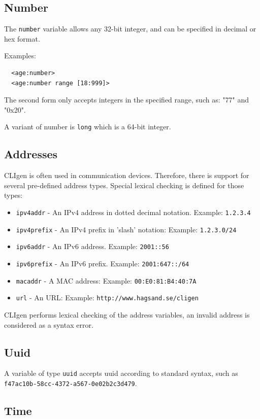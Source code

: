\documentclass[a4paper, 10pt] {article}
\begin{document}
\subsection{Number}
The {\tt number} variable allows any 32-bit integer, and can be specified in decimal
or hex format. 

Examples:
\begin{verbatim}
  <age:number>
  <age:number range [18:999]>
\end{verbatim}

The second form only accepts integers in the specified
range, such as: "77" and "0x20".

A variant of number is {\tt long} which is a 64-bit integer.

\subsection{Addresses}

CLIgen is often used in communication devices. Therefore, there is
support for several pre-defined address types.  Special lexical
checking is defined for those types:

\begin{itemize}
\item {\tt ipv4addr} - An IPv4 address in dotted decimal notation. Example: {\tt 1.2.3.4}
\item {\tt ipv4prefix} - An IPv4 prefix in 'slash' notation: Example: {\tt 1.2.3.0/24}
\item {\tt ipv6addr} - An IPv6 address. Example: {\tt 2001::56}
\item {\tt ipv6prefix} - An IPv6 prefix. Example: {\tt 2001:647::/64}
\item {\tt macaddr} - A MAC address: Example: {\tt 00:E0:81:B4:40:7A}
\item {\tt url} - An URL: Example: {\tt http://www.hagsand.se/cligen}
\end{itemize}

CLIgen performs lexical checking of the address variables, an invalid
address is considered as a syntax error.

\subsection{Uuid}

A variable of type {\tt uuid} accepts uuid according to standard syntax,
such as {\tt f47ac10b-58cc-4372-a567-0e02b2c3d479}. 


\subsection{Time}
\end{document}
